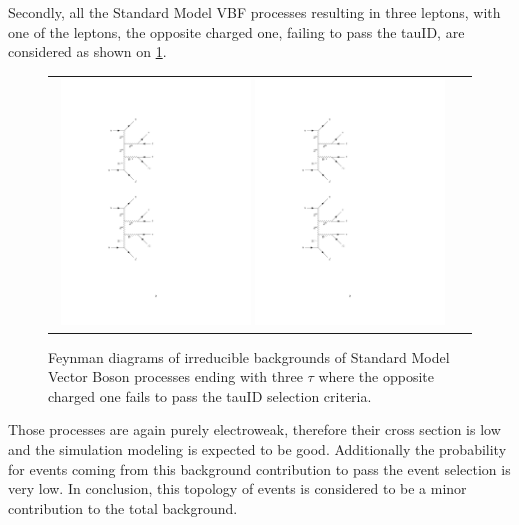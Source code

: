Secondly, all the Standard Model VBF processes resulting in three leptons, with one of the leptons, the opposite charged one, failing to pass the tauID, are considered as shown on \ref{fig:background_SMVBFZ0Wmiss}.

\begin{figure}[tbh!]
	\centering
	\begin{tabular}{cc}
		\includegraphics[width=0.48\textwidth]{diagrams/pics/background_SMVBFZ0Wmissminus.pdf}
		\includegraphics[width=0.48\textwidth]{diagrams/pics/background_SMVBFZ0Wmissplus.pdf} 		
	\end{tabular}
	\caption{Feynman diagrams of irreducible backgrounds of Standard Model Vector Boson  processes ending with three $\tau$ where the opposite charged one fails to pass the tauID selection criteria. }
	\label{fig:background_SMVBFZ0Wmiss}
\end{figure}

Those processes are again purely electroweak, therefore their cross section is low and the simulation modeling is expected to be good. Additionally the probability for events coming from this background contribution to pass the event selection is very low. In conclusion, this topology of events is considered to be a minor contribution to the total background.  

